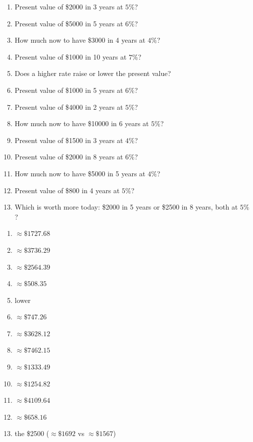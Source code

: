 \documentclass[11pt]{article}
\begin{document}
\begin{recapbox}
\begin{multicols}{2}
\small
\begin{enumerate}[leftmargin=*,itemsep=3pt]
  \item Present value of \$2000 in 3 years at $5\%$?
  \item Present value of \$5000 in 5 years at $6\%$?
  \item How much now to have \$3000 in 4 years at $4\%$?
  \item Present value of \$1000 in 10 years at $7\%$?
  \item Does a higher rate raise or lower the present value?
  \item Present value of \$1000 in 5 years at $6\%$?
  \item Present value of \$4000 in 2 years at $5\%$?
  \item How much now to have \$10000 in 6 years at $5\%$?
  \item Present value of \$1500 in 3 years at $4\%$?
  \item Present value of \$2000 in 8 years at $6\%$?
  \item How much now to have \$5000 in 5 years at $4\%$?
  \item Present value of \$800 in 4 years at $5\%$?
  \item Which is worth more today: \$2000 in 5 years or \$2500 in 8 years, both at $5\%$?
\end{enumerate}
\end{multicols}
\end{recapbox}

\begin{keybox}
\begin{multicols}{2}
\small
\begin{enumerate}[leftmargin=*,itemsep=3pt]
  \item $\approx\$1727.68$
  \item $\approx\$3736.29$
  \item $\approx\$2564.39$
  \item $\approx\$508.35$
  \item lower
  \item $\approx\$747.26$
  \item $\approx\$3628.12$
  \item $\approx\$7462.15$
  \item $\approx\$1333.49$
  \item $\approx\$1254.82$
  \item $\approx\$4109.64$
  \item $\approx\$658.16$
  \item the \$2500 ($\approx\$1692$ vs $\approx\$1567$)
\end{enumerate}
\end{multicols}
\end{keybox}
\end{document}
